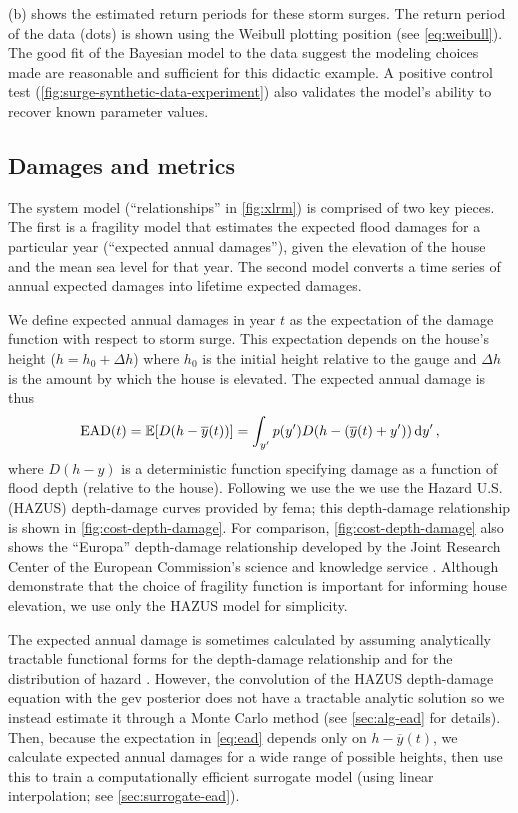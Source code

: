 \documentclass[11pt]{article}
\makeatletter
\DeclareRobustCommand\onedot{\futurelet\@let@token\@onedot}
\def\@onedot{\ifx\@let@token.\else.\null\fi\xspace}
\def\eg{\emph{e.g}\onedot} \def\Eg{\emph{E.g}\onedot}
\DeclareRobustCommand\onedot{\futurelet\@let@token\@onedot}
\def\@onedot{\ifx\@let@token.\else.\null\fi\xspace}
\def\eg{\emph{e.g}\onedot} \def\Eg{\emph{E.g}\onedot}
\makeatother
\begin{document}
(b) shows the estimated return periods for these storm surges.
The return period of the data (dots) is shown using the Weibull plotting position (see \cref{eq:weibull}).
The good fit of the Bayesian model to the data suggest the modeling choices made are reasonable and sufficient for this didactic example.
A positive control test (\cref{fig:surge-synthetic-data-experiment}) also validates the model's ability to recover known parameter values.

\subsection{Damages and metrics}\label{sec:case-metrics}

The system model (``relationships'' in \cref{fig:xlrm}) is comprised of two key pieces.
The first is a fragility model that estimates the expected flood damages for a particular year (``expected annual damages''), given the elevation of the house and the mean sea level for that year.
The second model converts a time series of annual expected damages into lifetime expected damages.

We define expected annual damages in year $t$ as the expectation of the damage function with respect to storm surge.
This expectation depends on the house's height ($h = h_0 + \Delta h$) where $h_0$ is the initial height relative to the gauge and $\Delta h$ is the amount by which the house is elevated.
The expected annual damage is thus
\begin{equation}\label{eq:ead}
    \textrm{EAD}(t) = \mathbb{E}[D \qty(h-\overline{y}(t))] = \int_{y'} p(y') D \qty(h - \qty(\overline{y}(t) + y')) \dd{y'},
\end{equation}
where $D(h-y)$ is a deterministic function specifying damage as a function of flood depth (relative to the house).
Following \citet{zarekarizi_suboptimal:2020} we use the we use the Hazard U.S. (HAZUS) depth-damage curves provided by \gls{fema}; this depth-damage relationship is shown in \cref{fig:cost-depth-damage}.
For comparison, \cref{fig:cost-depth-damage} also shows the ``Europa'' depth-damage relationship developed by the Joint Research Center of the European Commission's science and knowledge service \citep{huizinga_depthdamage:2016}.
Although \citet{zarekarizi_suboptimal:2020} demonstrate that the choice of fragility function is important for informing house elevation, we use only the HAZUS model for simplicity.

The expected annual damage is sometimes calculated by assuming analytically tractable functional forms for the depth-damage relationship and for the  distribution of hazard \citep[\eg][]{vandantzig_dike:1956}.
However, the convolution of the HAZUS depth-damage equation with the \gls{gev} posterior does not have a tractable analytic solution so we instead estimate it through a Monte Carlo method (see \cref{sec:alg-ead} for details).
Then, because the expectation in \cref{eq:ead} depends only on $h-\overline{y}(t)$, we calculate expected annual damages for a wide range of possible heights, then use this to train a computationally efficient surrogate model (using linear interpolation; see \cref{sec:surrogate-ead}).
\end{document}
